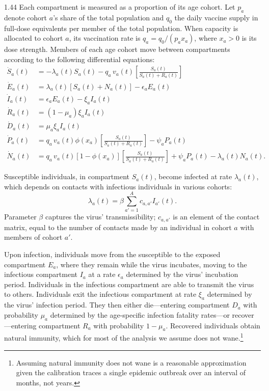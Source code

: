 \documentclass[12pt]{article}
\newcommand{\efficacy}{\phi}
\begin{document}
\begin{spacing}{1.44}
Each compartment is measured as a proportion of its age cohort. Let
$p_a$ denote cohort $a$'s share of the total population and $q_0$ the
daily vaccine supply in full-dose equivalents per member of the total
population. When capacity is allocated to cohort $a$, its vaccination
rate is $q_a = q_0/(p_a x_a)$, where $x_a>0$ is its dose strength.
Members of each age cohort move between compartments according to the
following differential equations:
\begin{align}
\dot{S}_a(t) &= - \lambda_a(t) S_a(t) - q_a \, v_a(t) \left[ \frac{S_a(t)}{S_a(t) + R_a(t)} \right]  \label{S} \\
\dot{E}_a(t) &= \lambda_a(t) [ S_a(t) + N_a(t) ] - \epsilon_a E_a(t) \label{E} \\
\dot{I}_a(t) &= \epsilon_a E_a(t) - \xi_a I_a(t) \label{I} \\
\dot{R}_a(t) &= (1 - \mu_a) \xi_a I_a(t) \label{R} \\
\dot{D}_a(t) &= \mu_a \xi_a I_a(t) \label{D} \\
\dot{P}_a(t) &= q_a \, v_a(t) \efficacy(x_a) \left[ \frac{S_a(t)}{S_a(t) + R_a(t)} \right] - \psi_a P_a(t) \label{P} \\
\dot{N}_a(t) &= q_a \, v_a(t) [ 1 - \efficacy(x_a)] \left[ \frac{S_a(t)}{S_a(t) + R_a(t)} \right] + \psi_a P_a(t) - \lambda_a(t) N_a(t). \label{N} 
\end{align}

Susceptible individuals, in compartment $S_a(t)$, become infected at
rate $\lambda_a(t)$, which depends on contacts with infectious
individuals in various cohorts:
\begin{equation}
\label{contact}
\lambda_a(t) = \beta \sum_{a' = 1}^A c_{a, a'} I_{a'}(t).
\end{equation}
Parameter $\beta$ captures the virus' transmissibility; $c_{a, a'}$ is
an element of the contact matrix, equal to the number of contacts made
by an individual in cohort $a$ with members of cohort $a'$.

Upon infection, individuals move from the susceptible to the exposed
compartment $E_a$, where they remain while the virus incubates, moving
to the infectious compartment $I_a$ at a rate $\epsilon_a$ determined
by the virus' incubation period. Individuals in the infectious
compartment are able to transmit the virus to others. Individuals exit
the infectious compartment at rate $\xi_a$ determined by the virus'
infection period. They then either die---entering compartment $D_a$
with probability $\mu_a$ determined by the age-specific infection
fatality rates---or recover---entering compartment $R_a$ with
probability $1 - \mu_a$. Recovered individuals obtain natural
immunity, which for most of the analysis we assume does not
wane.\footnote{Assuming natural immunity does not wane is a reasonable
approximation given the calibration traces a single epidemic outbreak
over an interval of months, not years.}


\end{spacing}
\end{document}

